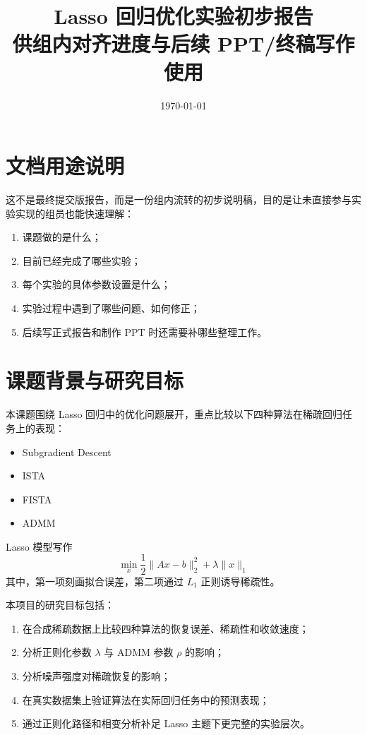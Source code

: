 \documentclass[12pt,a4paper]{ctexart}
\title{Lasso 回归优化实验初步报告\\
\large 供组内对齐进度与后续 PPT/终稿写作使用}
\author{}
\date{\today}
\begin{document}
\maketitle

\section{文档用途说明}
这不是最终提交版报告，而是一份组内流转的初步说明稿，目的是让未直接参与实验实现的组员也能快速理解：
\begin{enumerate}[label=\arabic*.]
    \item 课题做的是什么；
    \item 目前已经完成了哪些实验；
    \item 每个实验的具体参数设置是什么；
    \item 实验过程中遇到了哪些问题、如何修正；
    \item 后续写正式报告和制作 PPT 时还需要补哪些整理工作。
\end{enumerate}

\section{课题背景与研究目标}
本课题围绕 Lasso 回归中的优化问题展开，重点比较以下四种算法在稀疏回归任务上的表现：
\begin{itemize}[leftmargin=2em]
    \item Subgradient Descent
    \item ISTA
    \item FISTA
    \item ADMM
\end{itemize}

Lasso 模型写作
\[
\min_x \frac{1}{2}\|Ax-b\|_2^2 + \lambda \|x\|_1
\]
其中，第一项刻画拟合误差，第二项通过 $L_1$ 正则诱导稀疏性。

本项目的研究目标包括：
\begin{enumerate}[label=\arabic*.]
    \item 在合成稀疏数据上比较四种算法的恢复误差、稀疏性和收敛速度；
    \item 分析正则化参数 $\lambda$ 与 ADMM 参数 $\rho$ 的影响；
    \item 分析噪声强度对稀疏恢复的影响；
    \item 在真实数据集上验证算法在实际回归任务中的预测表现；
    \item 通过正则化路径和相变分析补足 Lasso 主题下更完整的实验层次。
\end{enumerate}
\end{document}
